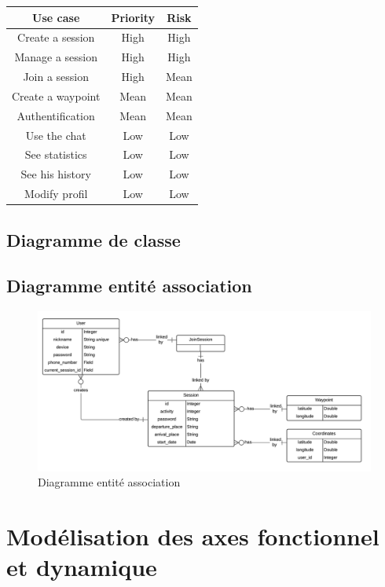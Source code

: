 \documentclass[titlepage, 12pt]{report}
\begin{document}
\begin{center}
	\begin{tabular}{|c|c|c|}
		\hline
		Use case & Priority & Risk \\ \hline
		Create a session & High & High \\ \hline
		Manage a session & High & High \\ \hline
		Join a session & High & Mean \\ \hline
		Create a waypoint & Mean & Mean \\ \hline
		Authentification & Mean & Mean \\ \hline
		Use the chat & Low & Low \\ \hline
		See statistics & Low & Low \\ \hline
		See his history & Low & Low \\ \hline
		Modify profil & Low & Low \\
		\hline \hline
	\end{tabular}
\end{center}

\subsection{Diagramme de classe}


\subsection{Diagramme entité association}

\begin{figure}[!h]
	\caption{Diagramme entité association}
	\label{database_ERD}
	\centering
	\includegraphics[scale=0.7]{Images/diagram/database_ERD.png}
\end{figure}

\section{Modélisation des axes fonctionnel et dynamique}
\end{document}
